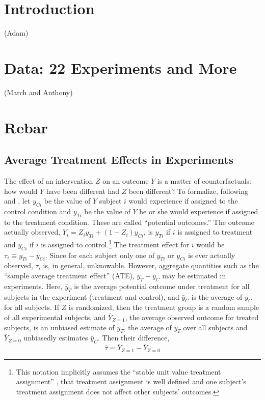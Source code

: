 \documentclass{edm_template}
\newcommand{\yti}{y_{Ti}}
\newcommand{\yci}{y_{Ci}}
\newcommand{\tauhat}{\hat{\tau}}
\begin{document}
\section{Introduction}
(Adam)

\section{Data: 22 Experiments and More}
(March and Anthony)

\section{Rebar}
\subsection{Average Treatment Effects in Experiments}
The effect of an intervention $Z$ on an outcome $Y$ is a matter of counterfactuals: how would $Y$ have been different had $Z$ been different? 
To formalize, following  and , let $\yci$ be the value of $Y$ subject $i$ would experience if assigned to the control condition and $\yti$ be the value of $Y$ he or she would experience if assigned to the treatment condition. These are called ``potential outcomes.'' The outcome actually observed, $Y_i=Z_i\yti+(1-Z_i)\yci$, is $\yti$ if $i$ is assigned to treatment and $\yci$ if $i$ is assigned to control.\footnote{This notation implicitly assumes the ``stable unit value treatment assignment'' \cite{sutva}, that treatment assignment is well defined and one subject's treatment assignment does not affect other subjects' outcomes.} The treatment effect for $i$ would be $\tau_i\equiv \yti-\yci$. Since for each subject only one of $\yti$ or $\yci$ is ever actually observed, $\tau_i$ is, in general, unknowable. However, aggregate quantities such as the ``sample average treatment effect'' (ATE), $\bar{y}_T-\bar{y}_C$ may be estimated in experiments. Here, $\bar{y}_T$ is the average potential outcome under treatment for all subjects in the experiment (treatment and control), and $\bar{y}_C$ is the average of $y_C$ for all subjects.
If $Z$ is randomized, then the treatment group is a random sample of all experimental subjects, and $\bar{Y}_{Z=1}$, the average observed outcome for treated subjects, is an unbiased estimate of $\bar{y}_T$, the average of $y_T$ over all subjects and $\bar{Y}_{Z=0}$ unbiasedly estimates $\bar{y}_C$. Then their difference, 
\begin{equation*}
\tauhat=\bar{Y}_{Z=1}-\bar{Y}_{Z=0}
\end{equation*}
\end{document}
